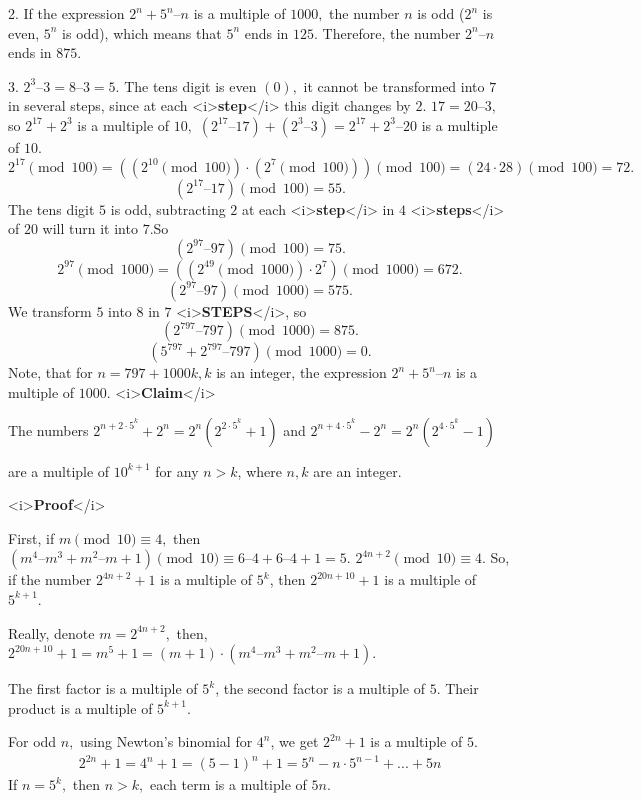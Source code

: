 \begin{enumerate}
 2. If the expression $2^n + 5^n – n$ is a multiple of $1000,$ the number $n$ is odd ($2^n$ is even, $5^n$ is odd), which means that $5^n$ ends in $125.$ Therefore, the number $2^n – n$ ends in $875.$

 3. $2^3 – 3 = 8 – 3 = 5.$ The tens digit is even $(0),$ it cannot be transformed into $7$ in several steps, since at each <i>\textbf{step}</i> this digit changes by $2.$
$17 = 20 – 3,$ so $2^{17} + 2^3$ is a multiple of $10,$ $(2^{17} – 17) + (2^3 – 3) = 2^{17} + 2^3 – 20$ is a multiple of $10.$ 
 \[2^{17} \pmod {100} = ((2^{10} \pmod {100}) \cdot (2^7 \pmod {100})) \pmod {100} = (24 \cdot 28) \pmod {100} = 72.\]
 \[(2^{17} – 17 ) \pmod {100}  = 55.\]The tens digit $5$ is odd, subtracting $2$ at each <i>\textbf{step}</i> in $4$ <i>\textbf{steps}</i> of $20$ will turn it into $7.$So 
 \[(2^{97} – 97 ) \pmod {100} = 75.\]
 \[2^{97} \pmod {1000} =  ((2^{49} \pmod {1000}) \cdot 2^7) \pmod {1000} =  672.\] 
 \[(2^{97} – 97 ) \pmod {1000} = 575.\]We transform $5$ into $8$ in $7$ <i>\textbf{STEPS}</i>, so  
 \[(2^{797} – 797 ) \pmod {1000} = 875.\]
 \[(5^{797} + 2^{797} – 797 ) \pmod {1000} = 0.\]Note, that for $n = 797 + 1000k, k$ is an integer, the expression $2^n + 5^n – n$ is a multiple of $1000.$
<i>\textbf{Claim}</i>

 The numbers  $2^{n+2\cdot 5^k}+2^n=2^n(2^{2\cdot 5^k}+1)$ and $2^{n+4\cdot 5^k}-2^n=2^n(2^{4\cdot 5^k}-1)$ 

 are a multiple of $10^{k+1}$ for any $n > k$, where $n,k$ are an integer.

 <i>\textbf{Proof}</i>

 First, if $m \pmod{10} \equiv 4,$ then  $(m^4 – m^3 + m^2 – m + 1) \pmod{10} \equiv 6 – 4 + 6 – 4 + 1 = 5.$
$2^{4n+2}\pmod{10} \equiv 4.$ So, if the number  $2^{4n+2}  + 1$ is a multiple of $5^k$, then $2^{20n+10} + 1$ is a multiple of $5^{k +1}.$

 Really, denote $m =  2^{4n+2},$ then,  $2^{20n+10} + 1 =  m^5 + 1 = (m + 1)\cdot (m^4 – m^3 + m^2 – m + 1).$

 The first factor is a multiple of $5^k$, the second factor is a multiple of $5.$ Their product is a multiple of  $5^{k +1}.$

 For odd $n,$ using Newton's binomial for $4^n$, we get $2^{2n} + 1$ is a multiple of $5.$ 
 \begin{align*} 2^{2n} + 1 = 4^n + 1 = (5 - 1)^n + 1 = 5^n -n\cdot 5^{n-1} +...+5n\end{align*}
If $n = 5^k,$ then $n > k,$ each term is  a multiple of $5n$.


\end{enumerate}
